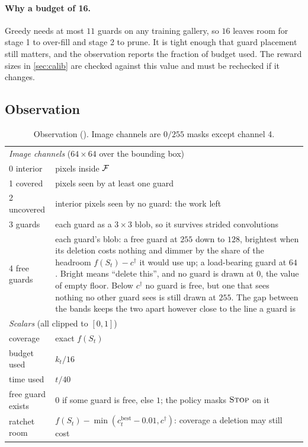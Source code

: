 \documentclass[11pt,a4paper]{article}
\begin{document}
\paragraph{Why a budget of 16.}
Greedy needs at most $11$ guards on any training gallery, so $16$ leaves room for stage 1 to
over-fill and stage 2 to prune. It is tight enough that guard placement still matters, and
the observation reports the fraction of budget used. The reward sizes in \cref{sec:calib}
are checked against this value and must be rechecked if it changes.

\subsection{Observation}\label{sec:obs}

\begin{table}[!htbp]
\centering\small
\caption{Observation (). Image channels are $0/255$ masks except channel 4.}
\label{tab:obs}
\begin{tabularx}{\linewidth}{lX}
\toprule
\multicolumn{2}{l}{\emph{Image channels} ($64\times64$ over the bounding box)} \\
0 interior & pixels inside $\mathcal{F}$ \\
1 covered & pixels seen by at least one guard \\
2 uncovered & interior pixels seen by no guard: the work left \\
3 guards & each guard as a $3\times3$ blob, so it survives strided convolutions \\
4 free guards & each guard's blob: a free guard at $255$ down to $128$, brightest when its
deletion costs nothing and dimmer by the share of the headroom $f(S_t)-c^\dagger$ it would use
up; a load-bearing guard at $64$. Bright means ``delete this'', and no guard is drawn at $0$, the
value of empty floor. Below $c^\dagger$ no guard is free, but one that sees nothing no other
guard sees is still drawn at $255$. The gap between the bands keeps the two apart however close
to the line a guard is \\
\midrule
\multicolumn{2}{l}{\emph{Scalars} (all clipped to $[0,1]$)} \\
coverage & exact $f(S_t)$ \\
budget used & $k_t/16$ \\
time used & $t/40$ \\
free guard exists & $0$ if some guard is free, else $1$; the policy masks $\textsc{Stop}$ on it \\
ratchet room & $f(S_t) - \min(c^{\mathrm{best}}_t - 0.01, c^\dagger)$: coverage a deletion may still cost \\
\bottomrule
\end{tabularx}
\end{table}
\end{document}

